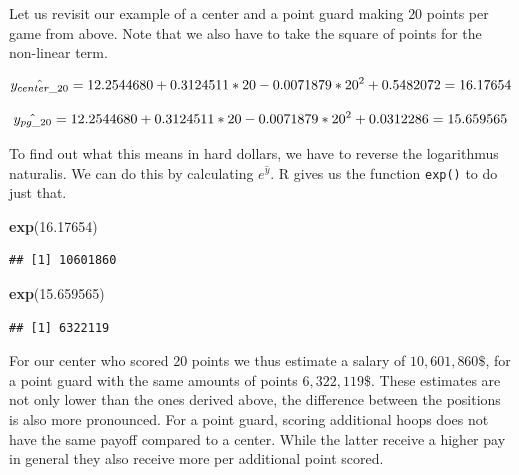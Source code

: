 \documentclass[
]{book}
\newenvironment{Shaded}{\begin{snugshade}}{\end{snugshade}}
\newcommand{\FloatTok}[1]{\textcolor[rgb]{0.00,0.00,0.81}{#1}}
\newcommand{\FunctionTok}[1]{\textcolor[rgb]{0.13,0.29,0.53}{\textbf{#1}}}
\newcommand{\NormalTok}[1]{#1}
\begin{document}
Let us revisit our example of a center and a point guard making \(20\) points
per game from above. Note that we also have to take the square of points for the
non-linear term.

\[\hat{y_{center\_20}} = 12.2544680 + 0.3124511 * 20 - 0.0071879 * 20^2 + 0.5482072 \\
= 16.17654\]

\[\hat{y_{pg\_20}} = 12.2544680 + 0.3124511 * 20 - 0.0071879 * 20^2 + 0.0312286 \\
= 15.659565\]

To find out what this means in hard dollars, we have to reverse the logarithmus
naturalis. We can do this by calculating \(e^{\hat{y}}\). R gives us the function
\texttt{exp()} to do just that.

\begin{Shaded}
\begin{Highlighting}[]
\FunctionTok{exp}\NormalTok{(}\FloatTok{16.17654}\NormalTok{)}
\end{Highlighting}
\end{Shaded}

\begin{verbatim}
## [1] 10601860
\end{verbatim}

\begin{Shaded}
\begin{Highlighting}[]
\FunctionTok{exp}\NormalTok{(}\FloatTok{15.659565}\NormalTok{)}
\end{Highlighting}
\end{Shaded}

\begin{verbatim}
## [1] 6322119
\end{verbatim}

For our center who scored \(20\) points we thus estimate a salary of
\(10,601,860\$\), for a point guard with the same amounts of points \(6,322,119\$\).
These estimates are not only lower than the ones derived above, the difference
between the positions is also more pronounced. For a point guard, scoring
additional hoops does not have the same payoff compared to a center. While the
latter receive a higher pay in general they also receive more per additional
point scored.
\end{document}
